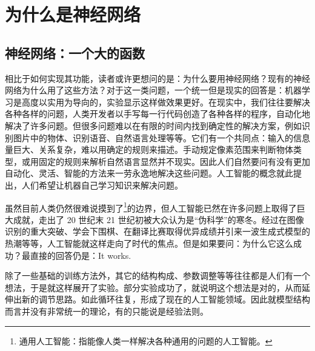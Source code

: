 \section{为什么是神经网络}
\subsection{神经网络：一个大的函数}

相比于如何实现其功能，读者或许更想问的是：为什么要用神经网络？现有的神经网络为什么用了这些方法？对于这一类问题，一个统一但是现实的回答是：机器学习是高度以实用为导向的，实验显示这样做效果更好。在现实中，我们往往要解决各种各样的问题，人类开发者以手写每一行代码创造了各种各样的程序，自动化地解决了许多问题。但很多问题难以在有限的时间内找到确定性的解决方案，例如识别图片中的物体、识别语音、自然语言处理等等。它们有一个共同点：输入的信息量巨大、关系复杂，难以用确定的规则来描述。手动规定像素范围来判断物体类型，或用固定的规则来解析自然语言显然并不现实。因此人们自然要问有没有更加自动化、灵活、智能的方法来一劳永逸地解决这些问题。人工智能的概念就此提出，人们希望让机器自己学习知识来解决问题。

虽然目前人类仍然很难说摸到了\footnote{通用人工智能：指能像人类一样解决各种通用的问题的人工智能。}的边界，但人工智能已然在许多问题上取得了巨大成就，走出了 20 世纪末 21 世纪初被大众认为是“伪科学”的寒冬。经过在图像识别的重大突破、学会下围棋、在翻译比赛取得优异成绩并引来一波生成式模型的热潮等等，人工智能就这样走向了时代的焦点。但是如果要问：为什么它这么成功？最直接的回答仍是：It works.

除了一些基础的训练方法外，其它的结构构成、参数调整等等往往都是人们有一个想法，于是就这样展开了实验。部分实验成功了，就说明这个想法是对的，从而延伸出新的调节思路。如此循环往复，形成了现在的人工智能领域。因此就模型结构而言并没有非常统一的理论，有的只能说是经验法则。

